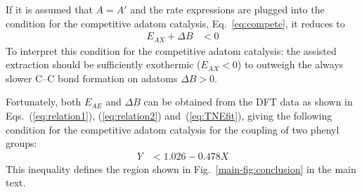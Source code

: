 \documentclass[aps,prl,reprint,amsmath,amssymb,floatfix,notitlepage]{revtex4-1}
\begin{document}
If it is assumed that $A=A'$ and the rate expressions are plugged into the condition for the competitive adatom catalysis, Eq.~\ref{eq:compete}, it reduces to
%
\begin{equation}
\begin{split}
E_{AX} + \Delta B &< 0
\end{split}
\end{equation}
%
To interpret this condition for the competitive adatom catalysis: the assisted extraction should be sufficiently exothermic ($E_{AX} < 0$) to outweigh the always slower C--C bond formation on adatoms $\Delta B > 0$.

Fortunately, both $E_{AE}$ and $\Delta B$ can be obtained from the DFT data as shown in Eqs.~(\ref{eq:relation1}), (\ref{eq:relation2}) and~(\ref{eq:TNEfit}), giving the following condition for the competitive adatom catalysis for the coupling of two phenyl groups: ~\cite{book-test1}
%
\begin{equation}
\begin{split}
Y &< 1.026 - 0.478 X
\end{split}
\end{equation}
%
This inequality defines the region shown in Fig.~\ref{main-fig:conclusion} in the main text.



\end{document}
